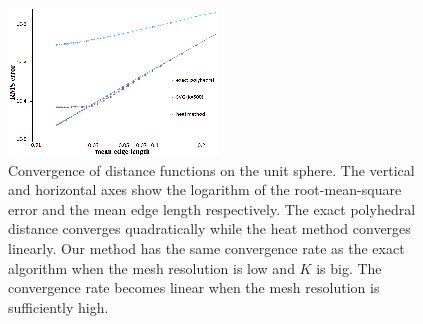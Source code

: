 \begin{figure}[htbp]
\centering
\includegraphics[width=0.995\linewidth]{figs/svg/convergence_rate2.png}
\caption{Convergence of distance functions on the unit sphere. The
vertical and horizontal axes show the logarithm of the
root-mean-square error and the mean edge length respectively. The
exact polyhedral distance converges quadratically while the heat
method converges linearly. Our method has the same convergence rate
as the exact algorithm when the mesh resolution is low and $K$ is
big. The convergence rate becomes linear when the mesh resolution is
sufficiently high.}
\label{fig:convergence}
\end{figure}

